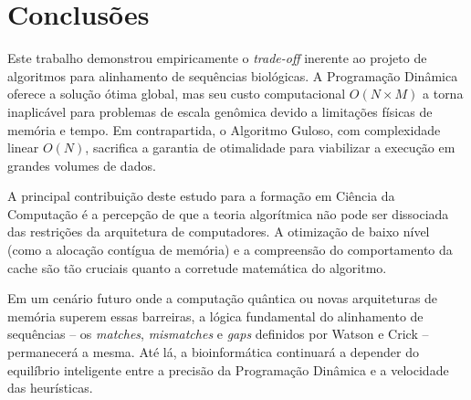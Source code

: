 \documentclass[12pt]{article}
\begin{document}
\section{Conclusões}
\label{sec:conclusoes}

Este trabalho demonstrou empiricamente o \textit{trade-off} inerente ao projeto de algoritmos para alinhamento de sequências biológicas. A Programação Dinâmica oferece a solução ótima global, mas seu custo computacional $O(N \times M)$ a torna inaplicável para problemas de escala genômica devido a limitações físicas de memória e tempo. Em contrapartida, o Algoritmo Guloso, com complexidade linear $O(N)$, sacrifica a garantia de otimalidade para viabilizar a execução em grandes volumes de dados.

A principal contribuição deste estudo para a formação em Ciência da Computação é a percepção de que a teoria algorítmica não pode ser dissociada das restrições da arquitetura de computadores. A otimização de baixo nível (como a alocação contígua de memória) e a compreensão do comportamento da cache são tão cruciais quanto a corretude matemática do algoritmo.

Em um cenário futuro onde a computação quântica ou novas arquiteturas de memória superem essas barreiras, a lógica fundamental do alinhamento de sequências -- os \textit{matches}, \textit{mismatches} e \textit{gaps} definidos por Watson e Crick -- permanecerá a mesma. Até lá, a bioinformática continuará a depender do equilíbrio inteligente entre a precisão da Programação Dinâmica e a velocidade das heurísticas.



\end{document}
